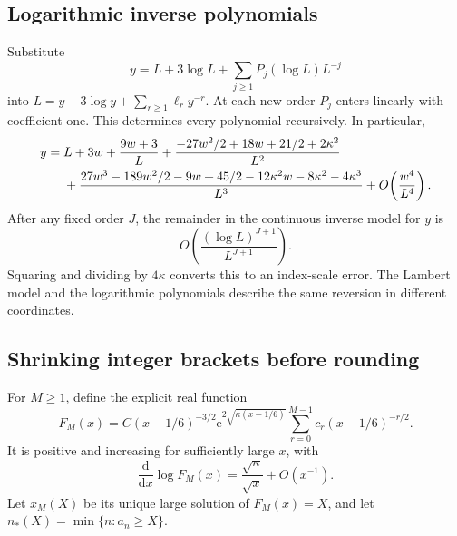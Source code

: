\documentclass[11pt]{article}
\numberwithin{equation}{section}
\theoremstyle{definition}\newtheorem{definition}[theorem]{Definition}
\theoremstyle{remark}\newtheorem{remark}[theorem]{Remark}
\newcommand{\ee}{\mathrm e}
\newcommand{\dd}{\mathrm d}%
\begin{document}
\subsection{Logarithmic inverse polynomials}
Substitute
\[
y=L+3\log L+\sum_{j\ge1}P_j(\log L)L^{-j}
\]
into $L=y-3\log y+\sum_{r\ge1}\ell_r y^{-r}$. At each new order $P_j$ enters linearly with coefficient one. This determines every polynomial recursively. In particular,
\begin{align}\label{lcp:ao:eq:logpolys}
 y={}&L+3w+\frac{9w+3}{L}
 +\frac{-27w^2/2+18w+21/2+2\kappa^2}{L^2}\notag\\
 &+\frac{27w^3-189w^2/2-9w+45/2-12\kappa^2w-8\kappa^2-4\kappa^3}{L^3}
 +O\!\left(\frac{w^4}{L^4}\right).
\end{align}
After any fixed order $J$, the remainder in the continuous inverse model for $y$ is
\[
O\!\left(\frac{(\log L)^{J+1}}{L^{J+1}}\right).
\]
Squaring and dividing by $4\kappa$ converts this to an index-scale error. The Lambert model and the logarithmic polynomials describe the same reversion in different coordinates.

\subsection{Shrinking integer brackets before rounding}
For $M\ge1$, define the explicit real function
\begin{equation}\label{lcp:ao:eq:model}
 F_M(x)=C(x-1/6)^{-3/2}\ee^{2\sqrt{\kappa(x-1/6)}}
 \sum_{r=0}^{M-1}c_r(x-1/6)^{-r/2}.
\end{equation}
It is positive and increasing for sufficiently large $x$, with
\[
\frac{\dd}{\dd x}\log F_M(x)=\frac{\sqrt\kappa}{\sqrt x}+O(x^{-1}).
\]
Let $x_M(X)$ be its unique large solution of $F_M(x)=X$, and let
$n_*(X)=\min\{n:a_n\ge X\}$.
\end{document}
